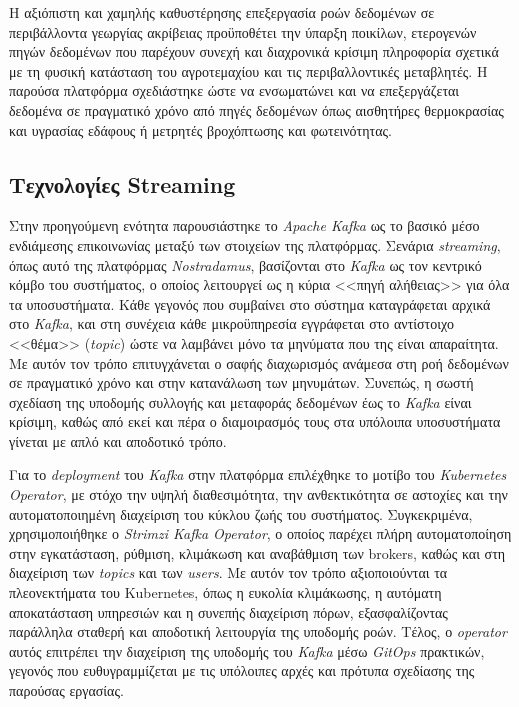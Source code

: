 Η αξιόπιστη και χαμηλής καθυστέρησης επεξεργασία ροών δεδομένων σε περιβάλλοντα
γεωργίας ακρίβειας προϋποθέτει την ύπαρξη ποικίλων, ετερογενών πηγών δεδομένων
που παρέχουν συνεχή και διαχρονικά κρίσιμη πληροφορία σχετικά με τη φυσική
κατάσταση του αγροτεμαχίου και τις περιβαλλοντικές μεταβλητές. Η παρούσα
πλατφόρμα σχεδιάστηκε ώστε να ενσωματώνει και να επεξεργάζεται δεδομένα σε
πραγματικό χρόνο από πηγές δεδομένων όπως αισθητήρες θερμοκρασίας και υγρασίας
εδάφους ή μετρητές βροχόπτωσης και φωτεινότητας.

\subsection{Τεχνολογίες Streaming}

Στην προηγούμενη ενότητα παρουσιάστηκε το \textit{Apache Kafka} ως το βασικό
μέσο ενδιάμεσης επικοινωνίας μεταξύ των στοιχείων της πλατφόρμας. Σενάρια
\textit{streaming}, όπως αυτό της πλατφόρμας \textit{Nostradamus}, βασίζονται
στο \textit{Kafka} ως τον κεντρικό κόμβο του συστήματος, ο οποίος λειτουργεί ως
η κύρια <<πηγή αλήθειας>> για όλα τα υποσυστήματα. Κάθε γεγονός που συμβαίνει
στο σύστημα καταγράφεται αρχικά στο \textit{Kafka}, και στη συνέχεια κάθε
μικροϋπηρεσία εγγράφεται στο αντίστοιχο <<θέμα>> (\textit{topic}) ώστε να
λαμβάνει μόνο τα μηνύματα που της είναι απαραίτητα. Με αυτόν τον τρόπο
επιτυγχάνεται ο σαφής διαχωρισμός ανάμεσα στη ροή δεδομένων σε πραγματικό χρόνο
και στην κατανάλωση των μηνυμάτων. Συνεπώς, η σωστή σχεδίαση της υποδομής
συλλογής και μεταφοράς δεδομένων έως το \textit{Kafka} είναι κρίσιμη, καθώς από
εκεί και πέρα ο διαμοιρασμός τους στα υπόλοιπα υποσυστήματα γίνεται με απλό και
αποδοτικό τρόπο.

Για το \textit{deployment} του \textit{Kafka} στην πλατφόρμα επιλέχθηκε το
μοτίβο του \textit{Kubernetes Operator}, με στόχο την υψηλή διαθεσιμότητα, την
ανθεκτικότητα σε αστοχίες και την αυτοματοποιημένη διαχείριση του κύκλου ζωής
του συστήματος. Συγκεκριμένα, χρησιμοποιήθηκε ο \textit{Strimzi Kafka
	Operator}, ο οποίος παρέχει πλήρη αυτοματοποίηση στην εγκατάσταση, ρύθμιση,
κλιμάκωση και αναβάθμιση των brokers, καθώς και στη διαχείριση των
\textit{topics} και των \textit{users}. Με αυτόν τον τρόπο αξιοποιούνται τα
πλεονεκτήματα του Kubernetes, όπως η ευκολία κλιμάκωσης, η αυτόματη
αποκατάσταση υπηρεσιών και η συνεπής διαχείριση πόρων, εξασφαλίζοντας παράλληλα
σταθερή και αποδοτική λειτουργία της υποδομής ροών. Τέλος, ο \textit{operator}
αυτός επιτρέπει την διαχείριση της υποδομής του \textit{Kafka} μέσω
\textit{GitOps} πρακτικών, γεγονός που ευθυγραμμίζεται με τις υπόλοιπες αρχές
και πρότυπα σχεδίασης της παρούσας εργασίας.

